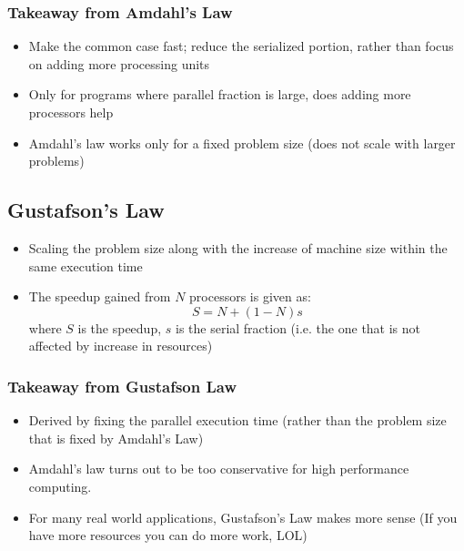 \documentclass{article}
\begin{document}
\subsubsection{Takeaway from Amdahl's Law}
\begin{itemize}
    \item Make the common case fast; reduce the serialized portion, rather than focus on adding more processing units
    
    \item Only for programs where parallel fraction is large, does adding more processors help
    
    \item Amdahl's law works only for a fixed problem size (does not scale with larger problems)
\end{itemize}

\subsection{Gustafson's Law}
\begin{itemize}
    \item Scaling the problem size along with the increase of machine size within the same execution time
    
    \item The speedup gained from $N$ processors is given as:
    \begin{equation}
        S = N + (1-N)s
    \end{equation}
    where $S$ is the speedup, $s$ is the serial fraction (i.e. the one that is not affected by increase in resources)
\end{itemize}

\subsubsection{Takeaway from Gustafson Law}
\begin{itemize}
    \item Derived by fixing the parallel execution time (rather than the problem size that is fixed by Amdahl's Law)
    
    \item Amdahl's law turns out to be too conservative for high performance computing. 
    
    \item For many real world applications, Gustafson's Law makes more sense (If you have more resources you can do more work, LOL)
\end{itemize}
\end{document}

